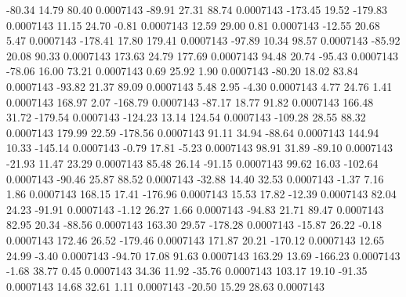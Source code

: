       -80.34       14.79       80.40     0.0007143
      -89.91       27.31       88.74     0.0007143
     -173.45       19.52     -179.83     0.0007143
       11.15       24.70       -0.81     0.0007143
       12.59       29.00        0.81     0.0007143
      -12.55       20.68        5.47     0.0007143
     -178.41       17.80      179.41     0.0007143
      -97.89       10.34       98.57     0.0007143
      -85.92       20.08       90.33     0.0007143
      173.63       24.79      177.69     0.0007143
       94.48       20.74      -95.43     0.0007143
      -78.06       16.00       73.21     0.0007143
        0.69       25.92        1.90     0.0007143
      -80.20       18.02       83.84     0.0007143
      -93.82       21.37       89.09     0.0007143
        5.48        2.95       -4.30     0.0007143
        4.77       24.76        1.41     0.0007143
      168.97        2.07     -168.79     0.0007143
      -87.17       18.77       91.82     0.0007143
      166.48       31.72     -179.54     0.0007143
     -124.23       13.14      124.54     0.0007143
     -109.28       28.55       88.32     0.0007143
      179.99       22.59     -178.56     0.0007143
       91.11       34.94      -88.64     0.0007143
      144.94       10.33     -145.14     0.0007143
       -0.79       17.81       -5.23     0.0007143
       98.91       31.89      -89.10     0.0007143
      -21.93       11.47       23.29     0.0007143
       85.48       26.14      -91.15     0.0007143
       99.62       16.03     -102.64     0.0007143
      -90.46       25.87       88.52     0.0007143
      -32.88       14.40       32.53     0.0007143
       -1.37        7.16        1.86     0.0007143
      168.15       17.41     -176.96     0.0007143
       15.53       17.82      -12.39     0.0007143
       82.04       24.23      -91.91     0.0007143
       -1.12       26.27        1.66     0.0007143
      -94.83       21.71       89.47     0.0007143
       82.95       20.34      -88.56     0.0007143
      163.30       29.57     -178.28     0.0007143
      -15.87       26.22       -0.18     0.0007143
      172.46       26.52     -179.46     0.0007143
      171.87       20.21     -170.12     0.0007143
       12.65       24.99       -3.40     0.0007143
      -94.70       17.08       91.63     0.0007143
      163.29       13.69     -166.23     0.0007143
       -1.68       38.77        0.45     0.0007143
       34.36       11.92      -35.76     0.0007143
      103.17       19.10      -91.35     0.0007143
       14.68       32.61        1.11     0.0007143
      -20.50       15.29       28.63     0.0007143
